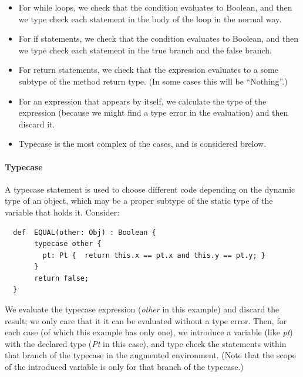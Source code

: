 \documentclass[11pt]{article}
\begin{document}
\begin{itemize}
\item For while loops, we check that the condition evaluates to
  Boolean, and then we type check each statement in the body of the
  loop in the normal way. 
\item For if statements, we check that the condition evaluates to
  Boolean, and then we type check each statement in the true branch
  and the false branch. 
\item For return statements, we check that the expression evaluates to
  a some subtype of the method return type.   (In some cases this will
  be ``Nothing''.) 
\item For an expression that appears by itself, we calculate the type
  of the expression (because we might find a type error in the
  evaluation) and then discard it. 
\item Typecase is the most complex of the cases, and is considered
  brelow. 
\end{itemize}

\paragraph{Typecase}

A typecase statement is used to choose different code depending on the
dynamic type of an object, which may be a proper subtype of the static type of
the variable that holds it.   Consider: 
\begin{verbatim}
  def  EQUAL(other: Obj) : Boolean {
       typecase other {
         pt: Pt {  return this.x == pt.x and this.y == pt.y; }
       }
       return false;
  }
\end{verbatim}

We evaluate the typecase expression (\emph{other} in this example) and
discard the result; we only care that it it can be evaluated without a
type error.  Then, for each case (of which this example has only one),
we introduce a variable (like \emph{pt}) with the declared type
(\emph{Pt} in this case), and type check the statements within that
branch of the typecase in the augmented environment.  (Note that the
scope of the introduced variable is only for that branch of the
typecase.) 
           
\end{document}
